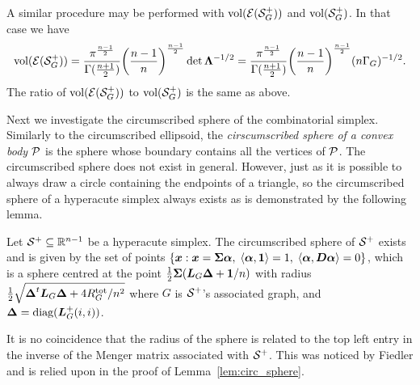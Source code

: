 A similar procedure may be performed  with $\vol(\El(\splx_G^+))$  and $\vol(\splx_G^+)$. In that  case we  have 
\begin{align*}
\vol(\El(\splx_G^+)) = \frac{\pi^{\frac{n-1}{2}}}{\Gamma(\frac{n+1}{2})} \bigg(\frac{n-1}{n}\bigg)^{\frac{n-1}{2}} \det\Eval^{-1/2} = \frac{\pi^{\frac{n-1}{2}}}{\Gamma(\frac{n+1}{2})} \bigg(\frac{n-1}{n}\bigg)^{\frac{n-1}{2}} (n\Gamma_G)^{-1/2}.
\end{align*}
The ratio  of $\vol(\El(\splx_G^+))$ to $\vol(\splx^+_G)$ is the same as above. 



Next we investigate the circumscribed sphere of the combinatorial  simplex. Similarly to the circumscribed ellipsoid, the \emph{cirscumscribed sphere  of a convex body $\P$} is the sphere whose boundary contains all the vertices of $\P$. The circumscribed sphere does not exist in general. However, just as it is possible to always draw a circle containing the endpoints  of a triangle, so the circumscribed sphere of a hyperacute simplex always exists  as is demonstrated  by the following lemma.  

\begin{lemma}
	\label{lem:circ_sphere}
	Let $\splx^+\subset\R^{n-1}$ be a hyperacute simplex. The circumscribed sphere  of $\splx^+$ exists and is given by the set of points $\{\x:\x=\Sv\balpha, \; \la \balpha,\one \ra = 1, \; \la \balpha,\D\balpha\ra =0\}$, which is a sphere centred at the point $\frac{1}{2}\Sv(\L_G\bD + \one/n)$ with radius $\frac{1}{2}\sqrt{\bD^\tp\L_G\bD + 4\Rtot_G/n^2}$ where $G$ is $\splx^+$'s associated graph, and $\bD = \diag(\L_G^+(i,i))$. 
\end{lemma}

\begin{remark}
	It is no coincidence that the radius of the sphere is related to the top left entry in the  inverse of the Menger matrix  associated with  $\splx^+$. This was  noticed by Fiedler and is relied  upon in  the proof of Lemma~\ref{lem:circ_sphere}. 
\end{remark}


